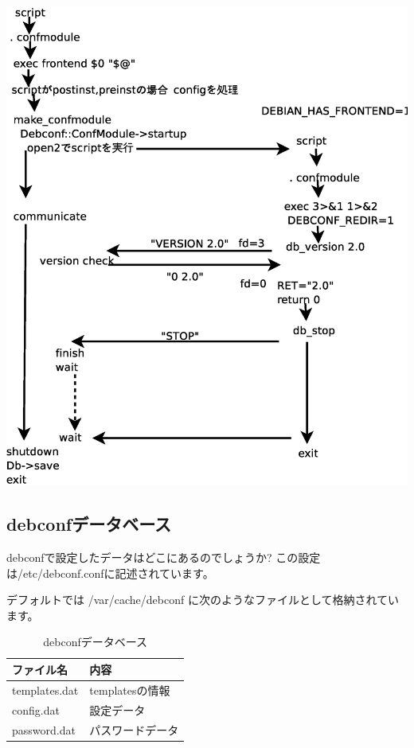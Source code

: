 \documentclass[mingoth,a4paper]{jsarticle}
\begin{document}
\includegraphics[scale=0.7]{image200509/debconf-protocol.eps}

\subsection{debconfデータベース}

debconfで設定したデータはどこにあるのでしょうか? この設定は/etc/debconf.confに記述されています。

デフォルトでは /var/cache/debconf に次のようなファイルとして格納されています。

\begin{table}[htbp]
 \begin{center}
 \begin{tabular}[htbp]{|l|p{20em}|}\hline
  ファイル名 & 内容 \\ \hline
  templates.dat & templatesの情報 \\ \hline
  config.dat & 設定データ \\ \hline
  password.dat & パスワードデータ \\ \hline
 \end{tabular}
 \end{center}
 \caption{debconfデータベース}
 \label{debconf:dbfile}
\end{table}
\end{document}
